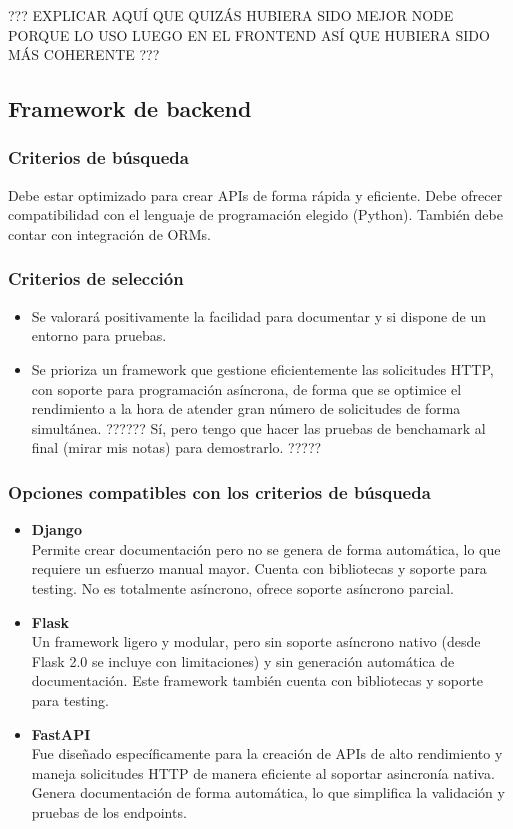 ??? EXPLICAR AQUÍ QUE QUIZÁS HUBIERA SIDO MEJOR NODE PORQUE LO USO LUEGO EN EL FRONTEND ASÍ QUE HUBIERA SIDO MÁS COHERENTE ???

\subsection{Framework de backend}
\subsubsection{Criterios de búsqueda}
Debe estar optimizado para crear APIs de forma rápida y eficiente.
Debe ofrecer compatibilidad con el lenguaje de programación elegido (Python). También debe contar con integración de ORMs.

\subsubsection{Criterios de selección}
\begin{itemize}
    \item Se valorará positivamente la facilidad para documentar y si dispone de un entorno para pruebas.
    \item Se prioriza un framework que gestione eficientemente las solicitudes HTTP, con soporte para programación asíncrona, de forma que se optimice el rendimiento a la hora de atender gran número de solicitudes de forma simultánea. ?????? Sí, pero tengo que hacer las pruebas de benchamark al final (mirar mis notas) para demostrarlo. ?????
\end{itemize}

\subsubsection{Opciones compatibles con los criterios de búsqueda}
\begin{itemize}
    \item \textbf{Django}\\
        Permite crear documentación pero no se genera de forma automática, lo que requiere un esfuerzo manual mayor. 
        Cuenta con bibliotecas y soporte para testing. No es totalmente asíncrono, ofrece soporte asíncrono parcial.
    \item \textbf{Flask}\\
        Un framework ligero y modular, pero sin soporte asíncrono nativo (desde Flask 2.0 se incluye con limitaciones) y sin generación automática de documentación. Este framework también cuenta con bibliotecas y soporte para testing.
    \item \textbf{FastAPI}\\
        Fue diseñado específicamente para la creación de APIs de alto rendimiento y maneja solicitudes HTTP de manera eficiente al soportar asincronía nativa.
        Genera documentación de forma automática, lo que simplifica la validación y pruebas de los endpoints.
\end{itemize}

